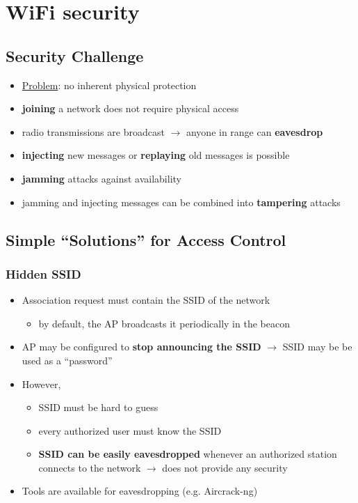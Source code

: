 \documentclass[final]{article}
\begin{document}
\section{WiFi security}
\subsection{Security Challenge}
\begin{itemize}[nosep]
    \item \underline{Problem}: no inherent physical protection
    \item \textbf{joining} a network does not require physical access
    \item radio transmissions are broadcast $\rightarrow$ anyone in range can \textbf{eavesdrop}
    \item \textbf{injecting} new messages or \textbf{replaying} old messages is possible
    \item \textbf{jamming} attacks against availability
    \item jamming and injecting messages can be combined into \textbf{tampering} attacks
\end{itemize}
\subsection{Simple “Solutions” for Access Control}
\subsubsection*{Hidden SSID}
\begin{itemize}[nosep]
    \item Association request must contain the SSID of the network
          \begin{itemize}[nosep]
              \item by default, the AP broadcasts it periodically in the beacon
          \end{itemize}
    \item AP may be configured to \textbf{stop announcing the SSID} $\rightarrow$ SSID may be be used as a ``password''
    \item However,
          \begin{itemize}[nosep]
              \item SSID must be hard to guess
              \item every authorized user must know the SSID
              \item \textbf{SSID can be easily eavesdropped} whenever an authorized station connects to the network $\rightarrow$ does not provide any security
          \end{itemize}
    \item Tools are available for eavesdropping (e.g. Aircrack-ng)
\end{itemize}
\end{document}
